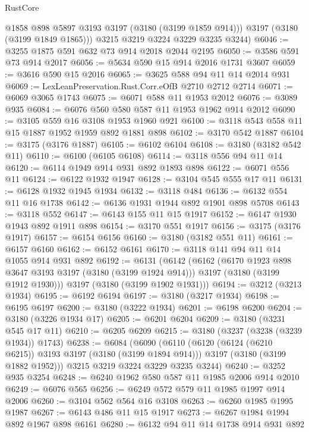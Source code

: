 \begin{lexlean}{RustCore}
\begin{coremodule}
          @1858
          @898
          @5897
          @3193
          @3197
          (@3180 (@3199 @1859 @914)))
        @3197
        (@3180 (@3199 @1849 @1865)))
      @3215
      @3219
      @3224
      @3229
      @3235
      @3244)
@6046 := @3255 @1875 @591 @632 @73 @914 @2018 @2044 @2195
@6050 := @3586 @591 @73 @914 @2017
@6056 := @5634 @590 @15 @914 @2016 @1731 @3607
@6059 := @3616 @590 @15 @2016
@6065 := @3625 @588 @94 @11 @14 @2014 @931
@6069 := LexLeanPreservation.Rust.Corr.eOfB @2710 @2712 @2714
@6071 := @6069 @3065 @1743
@6075 := @6071 @588 @11 @1953 @2012
@6076 := @3089 @935
@6084 := @6076 @560 @580 @587 @11 @1953 @1962 @914 @2012
@6090 := @3105 @559 @16 @3108 @1953 @1960 @921
@6100 := @3118 @543 @558 @11 @15 @1887 @1952 @1959 @892 @1881 @898
@6102 := @3170 @542 @1887
@6104 := @3175 (@3176 @1887)
@6105 := @6102 @6104
@6108 := @3180 (@3182 @542 @11)
@6110 := @6100 (@6105 @6108)
@6114 := @3118 @556 @94 @11 @14
@6120 := @6114 @1949 @914 @931 @892 @1893 @898
@6122 := @6071 @556 @11
@6124 := @6122 @1932 @1947
@6128 := @3104 @545 @555 @17 @11
@6131 := @6128 @1932 @1945 @1934
@6132 := @3118 @484
@6136 := @6132 @554 @11 @16 @1738
@6142 := @6136 @1931 @1944 @892 @1901 @898 @5708
@6143 := @3118 @552
@6147 := @6143 @155 @11 @15 @1917
@6152 := @6147 @1930 @1943 @892 @1911 @898
@6154 := @3170 @551 @1917
@6156 := @3175 (@3176 @1917)
@6157 := @6154 @6156
@6160 := @3180 (@3182 @551 @11)
@6161 := @6157 @6160
@6162 := @6152 @6161
@6170 := @3118 @141 @94 @11 @14 @1055 @914 @931 @892
@6192 := @6131
    (@6142
      (@6162
        (@6170 @1923 @898 @3647 @3193 @3197 (@3180 (@3199 @1924 @914)))
        @3197
        (@3180 (@3199 @1912 @1930)))
      @3197
      (@3180 (@3199 @1902 @1931)))
@6194 := @3212 (@3213 @1934)
@6195 := @6192 @6194
@6197 := @3180 (@3217 @1934)
@6198 := @6195 @6197
@6200 := @3180 (@3222 @1934)
@6201 := @6198 @6200
@6204 := @3180 (@3226 @1934 @17)
@6205 := @6201 @6204
@6209 := @3180 (@3231 @545 @17 @11)
@6210 := @6205 @6209
@6215 := @3180 (@3237 (@3238 (@3239 @1934)) @1743)
@6238 := @6084
    (@6090
      (@6110
        (@6120 (@6124 (@6210 @6215)) @3193 @3197 (@3180 (@3199 @1894 @914)))
        @3197
        (@3180 (@3199 @1882 @1952)))
      @3215
      @3219
      @3224
      @3229
      @3235
      @3244)
@6240 := @3252 @935 @3254
@6248 := @6240 @1962 @580 @587 @11 @1985 @2006 @914 @2010
@6249 := @6076 @565
@6256 := @6249 @572 @579 @11 @1985 @1997 @914 @2006
@6260 := @3104 @562 @564 @16 @3108
@6263 := @6260 @1985 @1995 @1987
@6267 := @6143 @486 @11 @15 @1917
@6273 := @6267 @1984 @1994 @892 @1967 @898 @6161
@6280 := @6132 @94 @11 @14 @1738 @914 @931 @892

\end{coremodule}
\end{lexlean}
